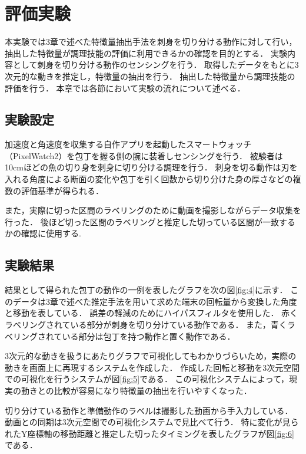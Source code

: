 \section{評価実験}
本実験では3章で述べた特徴量抽出手法を刺身を切り分ける動作に対して行い，抽出した特徴量が調理技能の評価に利用できるかの確認を目的とする．
実験内容として刺身を切り分ける動作のセンシングを行う．
取得したデータをもとに3次元的な動きを推定し，特徴量の抽出を行う．
抽出した特徴量から調理技能の評価を行う．
本章では各節において実験の流れについて述べる．
\subsection{実験設定}
加速度と角速度を収集する自作アプリを起動したスマートウォッチ（PixelWatch2）を包丁を握る側の腕に装着しセンシングを行う．
被験者は10cmほどの魚の切り身を刺身に切り分ける調理を行う．
刺身を切る動作は刃を入れる角度による断面の変化や包丁を引く回数から切り分けた身の厚さなどの複数の評価基準が得られる．

また，実際に切った区間のラベリングのために動画を撮影しながらデータ収集を行った．
後ほど切った区間のラベリングと推定した切っている区間が一致するかの確認に使用する.
\subsection{実験結果}
結果として得られた包丁の動作の一例を表したグラフを次の図\ref{fig:4}に示す．
このデータは3章で述べた推定手法を用いて求めた端末の回転量から変換した角度と移動を表している．
誤差の軽減のためにハイパスフィルタを使用した．
赤くラベリングされている部分が刺身を切り分けている動作である．
また，青くラベリングされている部分は包丁を持つ動作と置く動作である．

3次元的な動きを扱うにあたりグラフで可視化してもわかりづらいため，実際の動きを画面上に再現するシステムを作成した．
作成した回転と移動を3次元空間での可視化を行うシステムが図\ref{fig:5}である．
この可視化システムによって，現実の動きとの比較が容易になり特徴量の抽出を行いやすくなった．

切り分けている動作と準備動作のラベルは撮影した動画から手入力している．
動画との同期は3次元空間での可視化システムで見比べて行う．
特に変化が見られたY座標軸の移動距離と推定した切ったタイミングを表したグラフが図\ref{fig:6}である．



